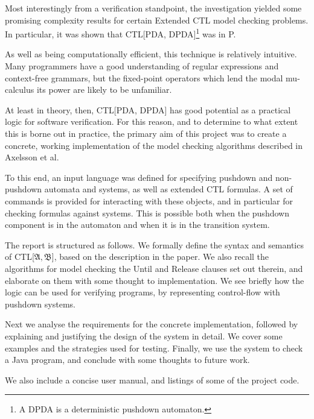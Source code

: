 \documentclass[11pt]{article}
\theoremstyle{definition}
\begin{document}
Most interestingly from a verification standpoint, the investigation yielded
some promising complexity results for certain Extended CTL model checking
problems. In particular, it was shown  that CTL[PDA, DPDA]\footnote{A
DPDA is a deterministic pushdown automaton.} was in P.

As well as being computationally efficient, this technique is relatively
intuitive. Many programmers have a good understanding of regular expressions
and context-free grammars, but the fixed-point operators which lend the modal
mu-calculus its power are likely to be unfamiliar.


At least in theory, then, CTL[PDA, DPDA] has good potential as a practical
logic for software verification. For this reason, and to determine to what
extent this is borne out in practice, the primary aim of this project was to
create a concrete, working implementation of the model checking algorithms
described in Axelsson et al.


To this end, an input language was defined for specifying pushdown and
non-pushdown automata and systems, as well as extended CTL formulas.  A set of
commands is provided for interacting with these objects, and in particular for
checking formulas against systems.  This is possible both when the pushdown
component is in the automaton and when it is in the transition system.



The report is structured as follows. We formally define the syntax and
semantics of CTL[$\mathfrak{A}, \mathfrak{B}$], based on the description in the
paper. We also recall the algorithms for model checking the Until and Release
clauses set out therein, and elaborate on them with some thought to
implementation. We see briefly how the logic can be used for verifying
programs, by representing
control-flow with pushdown systems. 

Next we analyse the requirements for the concrete implementation, followed by
explaining and justifying the design of the system in detail. We cover some
examples and the strategies used for testing. Finally, we use the system to
check a Java program, and conclude with some thoughts to future work.

We also include a concise user manual, and listings of some of the project
code.
\end{document}
